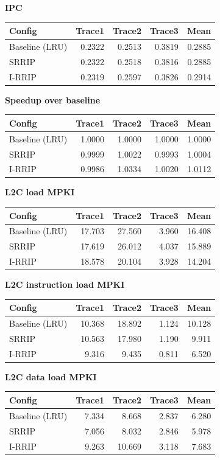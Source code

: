 \textbf{IPC}\\[2pt]
\begin{tabular}{lrrrr}\toprule
Config & Trace1 & Trace2 & Trace3 & Mean \\ \midrule
Baseline (LRU) & 0.2322 & 0.2513 & 0.3819 & 0.2885 \\
SRRIP & 0.2322 & 0.2518 & 0.3816 & 0.2885 \\
I-RRIP & 0.2319 & 0.2597 & 0.3826 & 0.2914 \\
\bottomrule\end{tabular}
\medskip

\textbf{Speedup over baseline}\\[2pt]
\begin{tabular}{lrrrr}\toprule
Config & Trace1 & Trace2 & Trace3 & Mean \\ \midrule
Baseline (LRU) & 1.0000 & 1.0000 & 1.0000 & 1.0000 \\
SRRIP & 0.9999 & 1.0022 & 0.9993 & 1.0004 \\
I-RRIP & 0.9986 & 1.0334 & 1.0020 & 1.0112 \\
\bottomrule\end{tabular}
\medskip

\textbf{L2C load MPKI}\\[2pt]
\begin{tabular}{lrrrr}\toprule
Config & Trace1 & Trace2 & Trace3 & Mean \\ \midrule
Baseline (LRU) & 17.703 & 27.560 & 3.960 & 16.408 \\
SRRIP & 17.619 & 26.012 & 4.037 & 15.889 \\
I-RRIP & 18.578 & 20.104 & 3.928 & 14.204 \\
\bottomrule\end{tabular}
\medskip

\textbf{L2C instruction load MPKI}\\[2pt]
\begin{tabular}{lrrrr}\toprule
Config & Trace1 & Trace2 & Trace3 & Mean \\ \midrule
Baseline (LRU) & 10.368 & 18.892 & 1.124 & 10.128 \\
SRRIP & 10.563 & 17.980 & 1.190 & 9.911 \\
I-RRIP & 9.316 & 9.435 & 0.811 & 6.520 \\
\bottomrule\end{tabular}
\medskip

\textbf{L2C data load MPKI}\\[2pt]
\begin{tabular}{lrrrr}\toprule
Config & Trace1 & Trace2 & Trace3 & Mean \\ \midrule
Baseline (LRU) & 7.334 & 8.668 & 2.837 & 6.280 \\
SRRIP & 7.056 & 8.032 & 2.846 & 5.978 \\
I-RRIP & 9.263 & 10.669 & 3.118 & 7.683 \\
\bottomrule\end{tabular}
\medskip
